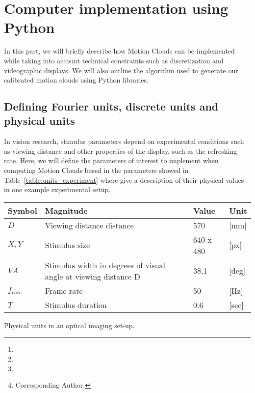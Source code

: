 \documentclass[a4paper,11pt]{article}%
\title{\Title}%
\date{}%
\author[1,2]{\AuthorA \thanks{\EmailA}}
\author[1,2]{\AuthorB \thanks{\EmailB}}
\author[1,2]{\AuthorC \thanks{\EmailC}}
\author[1,2]{\AuthorD \thanks{Corresponding Author, \EmailD}}%
\affil[1]{\AddressA}
\affil[2]{\AddressB}
\begin{document}
\maketitle
\vspace{-1cm}


%


\section{Computer implementation using Python}
In this part, we will briefly describe how Motion Clouds can be implemented while taking into account technical constraints such as discretization and videographic displays. We will also outline the algorithm used to generate our calibrated motion clouds using Python libraries. %

\subsection{Defining Fourier units, discrete units and physical units}\label{subsub:Normalised_Units}
In vision research, stimulus parameters depend on experimental conditions such as viewing distance and other properties of the display, such as the refreshing rate. Here, we will define the parameters of interest to implement when computing Motion Clouds based in the parameters showed in Table~\ref{table:units_experiment} where give a description of their physical values in one example experimental setup.

\begin{mytable}
\begin{center}
 \begin{tabular}{l l l l}
 \toprule
 Symbol  & Magnitude & Value & Unit \\
  \hline
 $D$    & Viewing distance distance & 570  & [mm]\\
 $X,Y$ & Stimulus size &  640 x 480 &[px] \\
$VA$\footnote   & Stimulus width in degrees of visual angle at viewing distance D & 38,1 &[deg] \\
$ f_{rate}$   & Frame rate  &  50 &[Hz] \\ 
$ T $   & Stimulus duration & 0.6 &[sec]\\
 \bottomrule
\end{tabular}
  \caption{Physical units in an optical imaging set-up.} 
  \label{table:units_experiment}
\end{center}
\end{mytable}
\end{document}
